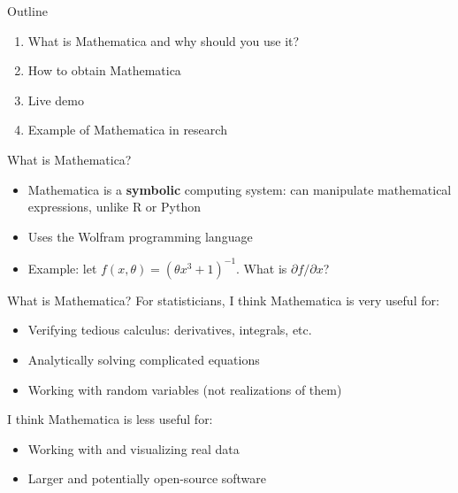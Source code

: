 \documentclass[dvipsnames]{beamer}
\newcommand{\1}{\mathds{1}}	%
\begin{document}

\title{}
\author{\textbf{Cornell Statistics Graduate Society}\\Sara Venkatraman}
\date{}

\begin{frame}
\vspace{1.2cm}\titlepage
\end{frame}


\begin{frame}{Outline}
\begin{enumerate}
\item What is Mathematica and why should you use it?
\item How to obtain Mathematica
\item Live demo
\item Example of Mathematica in research
\end{enumerate}
\end{frame}

\begin{frame}{What is Mathematica?}
\begin{itemize}
\item Mathematica is a \textbf{symbolic} computing system: can manipulate mathematical expressions, unlike R or Python
\item Uses the Wolfram programming language
\item Example: let $f(x,\theta) = (\theta x^3 + 1)^{-1}$. What is $\partial f/\partial x$?
\end{itemize}
\begin{figure}[H]
\centering{}	
\end{figure}
\end{frame}

\begin{frame}{What is Mathematica?}
For statisticians, I think Mathematica is very useful for:	
\begin{itemize}
\item Verifying tedious calculus: derivatives, integrals, etc.
\item Analytically solving complicated equations
\item Working with random variables {\scriptsize (not realizations of them)}
\end{itemize}\vspace{.5cm}

I think Mathematica is less useful for:
\begin{itemize}
\item Working with and visualizing real data	
\item Larger and potentially open-source software
\end{itemize}
\end{frame}
\end{document}
